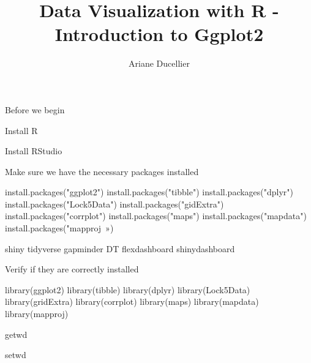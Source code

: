 \documentclass{beamer}
\title[Introduction to Ggplot2]{Data Visualization with R - Introduction to Ggplot2}
\author{Ariane Ducellier}
\begin{document}
	\begin{frame}
		\titlepage
	\end{frame}

	\begin{frame}


Before we begin

Install R

Install RStudio

Make sure we have the necessary packages installed

install.packages("ggplot2")
install.packages("tibble")
install.packages("dplyr")
install.packages("Lock5Data")
install.packages("gidExtra")
install.packages("corrplot")
install.packages("maps")
install.packages("mapdata")
install.packages("mapproj »)

shiny
tidyverse
gapminder
DT
flexdashboard
shinydashboard

Verify if they are correctly installed

library(ggplot2)
library(tibble)
library(dplyr)
library(Lock5Data)
library(gridExtra)
library(corrplot)
library(maps)
library(mapdata)
library(mapproj)


getwd

setwd

	\end{frame}
\end{document}
